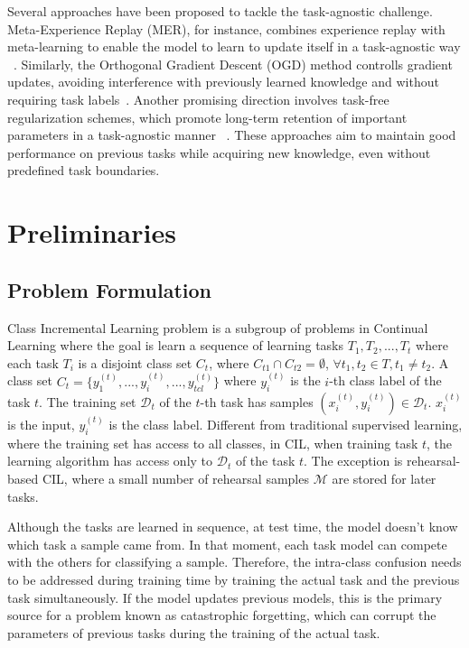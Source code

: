 \documentclass[letterpaper]{article} %
\begin{document}
Several approaches have been proposed to tackle the task-agnostic challenge. Meta-Experience Replay (MER), for instance,  combines experience replay with meta-learning to enable the model to learn to update itself in a task-agnostic way ~\cite{riemer2019learning}. Similarly, the Orthogonal Gradient Descent (OGD) method controlls gradient updates, avoiding interference with previously learned knowledge and without requiring task labels~\cite{farajtabar2020orthogonal}. Another promising direction involves task-free regularization schemes, which promote long-term retention of important parameters in a task-agnostic manner ~\cite{zenke2017continual}. These approaches aim to maintain good performance on previous tasks while acquiring new knowledge, even without predefined task boundaries.

\section{Preliminaries}

\subsection{Problem Formulation}

Class Incremental Learning problem is a subgroup of problems in Continual Learning where the goal is learn a sequence of learning tasks $T_1, T_2, ..., T_t$ where each task $T_i$ is a disjoint class set  $C_t$, where $C_{t1}\cap C_{t2} = \emptyset$, $\forall t_1, t_2 \in T, t_1\neq t_2$. A class set $C_t = \{ y^{(t)}_1,...,y^{(t)}_i,...,y^{(t)}_{tcl}\}$ where $y^{(t)}_i$ is the $i$-th class label of the task $t$. The training set  $\mathcal{D}_t$ of the $t$-th task has samples $(x_i^{(t)}, y_i^{(t)}) \in \mathcal{D}_t$. $x_i^{(t)}$ is the input, $y_i^{(t)}$ is the class label. Different from traditional supervised learning, where the training set has access to all classes, in CIL, when training task $t$, the learning algorithm has access only to $\mathcal{D}_t$ of the task $t$. The exception is rehearsal-based CIL, where a small number of rehearsal samples $\mathcal{M}$ are stored for later tasks.

Although the tasks are learned in sequence, at test time, the model doesn't know which task a sample came from. In that moment, each task model can compete with the others for classifying a sample. Therefore, the intra-class confusion needs to be addressed during training time by training the actual task and the previous task simultaneously. If the model updates previous models, this is the primary source for a problem known as catastrophic forgetting, which can corrupt the parameters of previous tasks during the training of the actual task.
\end{document}
